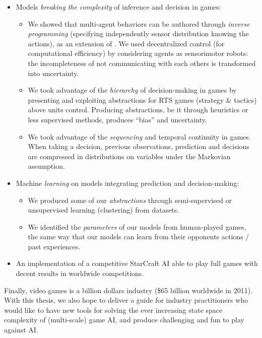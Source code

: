 \begin{itemize}
    \item  Models \textit{breaking the complexity} of inference and decision in games:
    \begin{itemize}
        \item We showed that multi-agent behaviors can be authored through \textit{inverse programming} (specifying independently sensor distribution knowing the actions), as an extension of \citep{theseRonan}. We used decentralized control (for computational efficiency) by considering agents as sensorimotor robots: the incompleteness of not communicating with each others is transformed into uncertainty.
        \item We took advantage of the \textit{hierarchy} of decision-making in games by presenting and exploiting abstractions for RTS games (strategy \& tactics) above units control. Producing abstractions, be it through heuristics or less supervised methods, produces ``bias'' and uncertainty.
        \item We took advantage of the \textit{sequencing} and temporal continuity in games. When taking a decision, previous observations, prediction and decisions are compressed in distributions on variables under the Markovian assumption. %
    \end{itemize}

    \item Machine \textit{learning} on models integrating prediction and decision-making:
    \begin{itemize}
        \item We produced some of our \textit{abstractions} through semi-supervised or unsupervised learning (clustering) from datasets.
        \item We identified the \textit{parameters} of our models from human-played games, the same way that our models can learn from their opponents actions / past experiences.
    \end{itemize}
    \item An implementation of a competitive StarCraft AI able to play full games with decent results in worldwide competitions.

\end{itemize}

Finally, video games is a billion dollars industry (\$65 billion worldwide in 2011). With this thesis, we also hope to deliver a guide for industry practitioners who would like to have new tools for solving the ever increasing state space complexity of (multi-scale) game AI, and produce challenging and fun to play against AI. %

